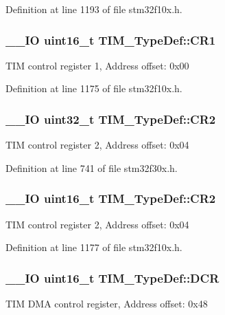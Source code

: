 Definition at line 1193 of file stm32f10x.\-h.

\hypertarget{struct_t_i_m___type_def_a410988826004fdd21d55071215144ba9}{
\subsubsection[{C\-R1}]{\setlength{\rightskip}{0pt plus 5cm}\-\_\-\-\_\-\-I\-O {\bf uint16\-\_\-t} T\-I\-M\-\_\-\-Type\-Def\-::\-C\-R1}}\label{struct_t_i_m___type_def_a410988826004fdd21d55071215144ba9}
T\-I\-M control register 1, Address offset\-: 0x00 

Definition at line 1175 of file stm32f10x.\-h.

\hypertarget{struct_t_i_m___type_def_a6b1ae85138ed91686bf63699c61ef835}{
\subsubsection[{C\-R2}]{\setlength{\rightskip}{0pt plus 5cm}\-\_\-\-\_\-\-I\-O {\bf uint32\-\_\-t} T\-I\-M\-\_\-\-Type\-Def\-::\-C\-R2}}\label{struct_t_i_m___type_def_a6b1ae85138ed91686bf63699c61ef835}
T\-I\-M control register 2, Address offset\-: 0x04 

Definition at line 741 of file stm32f30x.\-h.

\hypertarget{struct_t_i_m___type_def_a954eb69fd4e2e6b43ba6c80986f691d8}{
\subsubsection[{C\-R2}]{\setlength{\rightskip}{0pt plus 5cm}\-\_\-\-\_\-\-I\-O {\bf uint16\-\_\-t} T\-I\-M\-\_\-\-Type\-Def\-::\-C\-R2}}\label{struct_t_i_m___type_def_a954eb69fd4e2e6b43ba6c80986f691d8}
T\-I\-M control register 2, Address offset\-: 0x04 

Definition at line 1177 of file stm32f10x.\-h.

\hypertarget{struct_t_i_m___type_def_ad3186a43824621f049e7eff37c88ad4e}{
\subsubsection[{D\-C\-R}]{\setlength{\rightskip}{0pt plus 5cm}\-\_\-\-\_\-\-I\-O {\bf uint16\-\_\-t} T\-I\-M\-\_\-\-Type\-Def\-::\-D\-C\-R}}\label{struct_t_i_m___type_def_ad3186a43824621f049e7eff37c88ad4e}
T\-I\-M D\-M\-A control register, Address offset\-: 0x48 

